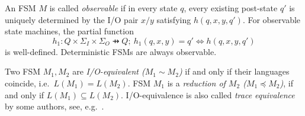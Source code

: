 An FSM $M$ is called \emph{observable} if in every state $q$, every existing post-state $q'$ is uniquely determined by the I/O pair $x/y$ satisfying $h(q,x,y,q')$. For
observable state machines, the partial function
$$
h_1 : Q\times\Sigma_I\times \Sigma_O \pfun Q;\    
h_1(q,x,y) = q' \Leftrightarrow h(q,x,y,q')
$$
is well-defined. Deterministic FSMs are always observable.

Two FSM $M_1, M_2$ are \emph{I/O-equivalent ($M_1\sim M_2$)} if and only if their languages coincide, i.e.~$L(M_1) = L(M_2)$. FSM $M_1$ is a \emph{reduction of $M_2$ ($M_1 \preceq M_2$)},
if and only if $L(M_1) \subseteq L(M_2)$. I/O-equivalence is also called 
\emph{trace equivalence} by some authors, see, e.g.~\cite{luo_test_1994}.
